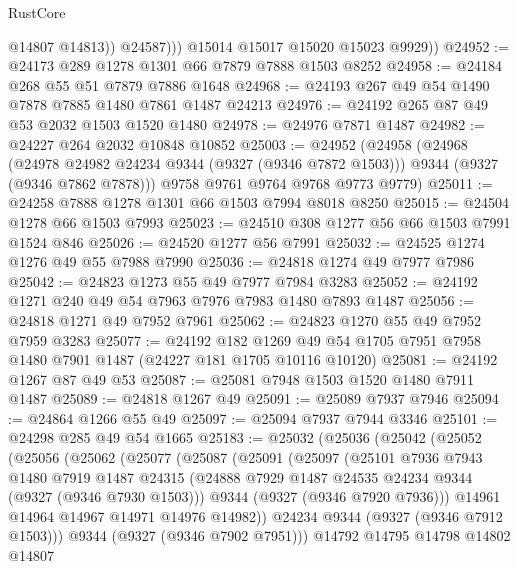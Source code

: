 \begin{lexlean}{RustCore}
\begin{coremodule}
                  @14807
                  @14813))
              @24587)))
        @15014
        @15017
        @15020
        @15023
        @9929))
@24952 := @24173 @289 @1278 @1301 @66 @7879 @7888 @1503 @8252
@24958 := @24184 @268 @55 @51 @7879 @7886 @1648
@24968 := @24193 @267 @49 @54 @1490 @7878 @7885 @1480 @7861 @1487 @24213
@24976 := @24192 @265 @87 @49 @53 @2032 @1503 @1520 @1480
@24978 := @24976 @7871 @1487
@24982 := @24227 @264 @2032 @10848 @10852
@25003 := @24952
    (@24958
      (@24968
        (@24978 @24982 @24234 @9344 (@9327 (@9346 @7872 @1503)))
        @9344
        (@9327 (@9346 @7862 @7878)))
      @9758
      @9761
      @9764
      @9768
      @9773
      @9779)
@25011 := @24258 @7888 @1278 @1301 @66 @1503 @7994 @8018 @8250
@25015 := @24504 @1278 @66 @1503 @7993
@25023 := @24510 @308 @1277 @56 @66 @1503 @7991 @1524 @846
@25026 := @24520 @1277 @56 @7991
@25032 := @24525 @1274 @1276 @49 @55 @7988 @7990
@25036 := @24818 @1274 @49 @7977 @7986
@25042 := @24823 @1273 @55 @49 @7977 @7984 @3283
@25052 := @24192 @1271 @240 @49 @54 @7963 @7976 @7983 @1480 @7893 @1487
@25056 := @24818 @1271 @49 @7952 @7961
@25062 := @24823 @1270 @55 @49 @7952 @7959 @3283
@25077 := @24192
    @182
    @1269
    @49
    @54
    @1705
    @7951
    @7958
    @1480
    @7901
    @1487
    (@24227 @181 @1705 @10116 @10120)
@25081 := @24192 @1267 @87 @49 @53
@25087 := @25081 @7948 @1503 @1520 @1480 @7911 @1487
@25089 := @24818 @1267 @49
@25091 := @25089 @7937 @7946
@25094 := @24864 @1266 @55 @49
@25097 := @25094 @7937 @7944 @3346
@25101 := @24298 @285 @49 @54 @1665
@25183 := @25032
    (@25036
      (@25042
        (@25052
          (@25056
            (@25062
              (@25077
                (@25087
                  (@25091
                    (@25097
                      (@25101
                        @7936
                        @7943
                        @1480
                        @7919
                        @1487
                        @24315
                        (@24888 @7929 @1487 @24535 @24234 @9344 (@9327 (@9346 @7930 @1503)))
                        @9344
                        (@9327 (@9346 @7920 @7936)))
                      @14961
                      @14964
                      @14967
                      @14971
                      @14976
                      @14982))
                  @24234
                  @9344
                  (@9327 (@9346 @7912 @1503)))
                @9344
                (@9327 (@9346 @7902 @7951)))
              @14792
              @14795
              @14798
              @14802
              @14807

\end{coremodule}
\end{lexlean}
